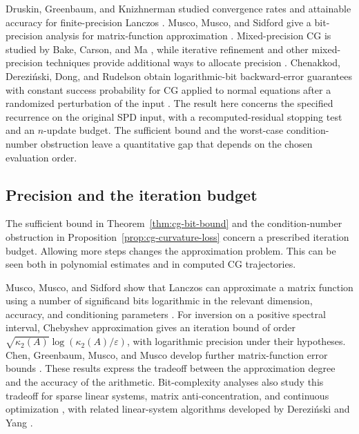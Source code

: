 \documentclass[11pt]{article}
\theoremstyle{definition}
\begin{document}
Druskin, Greenbaum, and Knizhnerman studied convergence rates and
attainable accuracy for finite-precision Lanczos
\cite{DruskinGreenbaumKnizhnerman1998}.  Musco, Musco, and Sidford give
a bit-precision analysis for matrix-function approximation
\cite{MuscoMuscoSidford2018}.  Mixed-precision CG is studied by Bake,
Carson, and Ma \cite{BakeCarsonMa2026}, while iterative refinement and
other mixed-precision techniques provide additional ways to allocate
precision \cite{CarsonHigham2018,HighamMary2022}.
Chenakkod, Derezi\'nski, Dong, and Rudelson obtain logarithmic-bit
backward-error guarantees with constant success probability for CG
applied to normal equations after a randomized perturbation of the input
\cite{ChenakkodDerezinskiDongRudelson2026}.
The result here concerns the specified recurrence on the original SPD
input, with a recomputed-residual stopping test and an $n$-update budget.
The sufficient bound and the worst-case condition-number obstruction
leave a quantitative gap that depends on the chosen evaluation order.
\subsection{Precision and the iteration budget}
\label{sec:two-regimes}

The sufficient bound in Theorem~\ref{thm:cg-bit-bound} and the
condition-number obstruction in Proposition~\ref{prop:cg-curvature-loss}
concern a prescribed iteration budget.  Allowing more steps changes the
approximation problem.  This can be seen both in polynomial estimates
and in computed CG trajectories.

Musco, Musco, and Sidford show that Lanczos can approximate a matrix
function using a number of significand bits logarithmic in the relevant
dimension, accuracy, and conditioning parameters
\cite{MuscoMuscoSidford2018}.  For inversion on a positive spectral
interval, Chebyshev approximation gives an iteration bound of order
$\sqrt{\kappa_2(A)}\log(\kappa_2(A)/\varepsilon)$, with logarithmic
precision under their hypotheses.  Chen, Greenbaum, Musco, and Musco
develop further matrix-function error bounds
\cite{ChenGreenbaumMuscoMusco2022}.  These results express the tradeoff
between the approximation degree and the accuracy of the arithmetic.
Bit-complexity analyses also study this tradeoff for sparse linear
systems, matrix anti-concentration, and continuous optimization
\cite{PengVempala2021,Nie2022,GhadiriPengVempala2023},
with related linear-system algorithms developed by Derezi\'nski and
Yang \cite{DerezinskiYang2024}.
\end{document}
